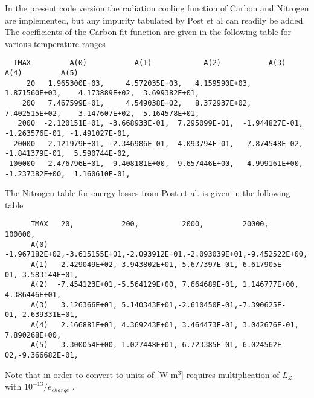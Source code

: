 \documentclass[amsmath,amssymb,a4]{revtex4-2}
\begin{document}
In the present code version the radiation cooling function of Carbon and Nitrogen are implemented, but any impurity tabulated by Post et al \cite{post1977} can readily be added. The coefficients of the Carbon fit function are given in the following table for various temperature ranges
\begin{small}\begin{verbatim}
  TMAX         A(0)           A(1)            A(2)           A(3)           A(4)         A(5)
     20   1.965300E+03, 	4.572035E+03, 	4.159590E+03,   1.871560E+03, 	 4.173889E+02,  3.699382E+01, 
    200   7.467599E+01, 	4.549038E+02, 	8.372937E+02,   7.402515E+02, 	 3.147607E+02,  5.164578E+01, 
   2000  -2.120151E+01, -3.668933E-01, 	7.295099E-01,  -1.944827E-01,  -1.263576E-01, -1.491027E-01, 
  20000   2.121979E+01, -2.346986E-01,  4.093794E-01,   7.874548E-02,  -1.841379E-01,  5.590744E-02, 
 100000  -2.476796E+01,  9.408181E+00, -9.657446E+00,   4.999161E+00,  -1.237382E+00,  1.160610E-01, 
	  \end{verbatim}\end{small}
The Nitrogen table for energy losses from Post et al. is given in the following table
      \begin{small} \begin{verbatim}
      TMAX	 20,           200,          2000,         20000,        100000,
      A(0)	-1.967182E+02,-3.615155E+01,-2.093912E+01,-2.093039E+01,-9.452522E+00, 
      A(1)	-2.429049E+02,-3.943802E+01,-5.677397E-01,-6.617905E-01,-3.583144E+01,
      A(2)	-7.454123E+01,-5.564129E+00, 7.664689E-01, 1.146777E+00, 4.386446E+01,
      A(3)	 3.126366E+01, 5.140343E+01,-2.610450E-01,-7.390625E-01,-2.639331E+01,
      A(4)	 2.166881E+01, 4.369243E+01, 3.464473E-01, 3.042676E-01, 7.890268E+00,
      A(5)	 3.300054E+00, 1.027448E+01, 6.723385E-01,-6.024562E-02,-9.366682E-01,
      	\end{verbatim}  \end{small}
Note that in order to convert to units of [W m$^3$] requires multiplication of $L_{Z}$ with $10^{-13}/e_{charge}$ . %
\end{document}
